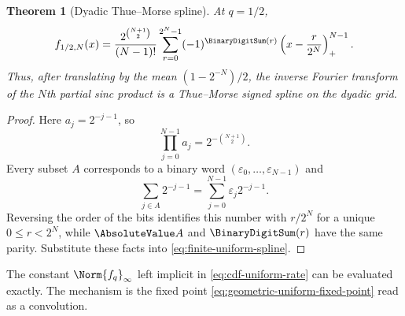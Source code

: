 \documentclass[11pt,a4paper,oneside,openany]{book}
\newtheorem{theorem}{Theorem}[chapter]
\theoremstyle{definition}
\theoremstyle{remark}
\begin{document}
\begin{theorem}[Dyadic Thue--Morse spline]\label{thm:dyadic-thue-morse-spline}
At $q=1/2$,
\begin{equation}\label{eq:dyadic-thue-morse-spline}
 f_{1/2,N}(x)
 =\frac{2^{\binom{N+1}{2}}}{(N-1)!}
 \sum_{r=0}^{2^N-1}(-1)^{\BinaryDigitSum(r)}
 \left(x-\frac r{2^N}\right)_+^{N-1}.
\end{equation}
Thus, after translating by the mean $(1-2^{-N})/2$, the inverse Fourier transform of the $N$th partial sinc product is a Thue--Morse signed spline on the dyadic grid.
\end{theorem}

\begin{proof}
Here $a_j=2^{-j-1}$, so
\[
 \prod_{j=0}^{N-1}a_j=2^{-\binom{N+1}{2}}.
\]
Every subset $A$ corresponds to a binary word $(\varepsilon_0,\ldots,\varepsilon_{N-1})$ and
\[
 \sum_{j\in A}2^{-j-1}
 =\sum_{j=0}^{N-1}\varepsilon_j2^{-j-1}.
\]
Reversing the order of the bits identifies this number with $r/2^N$ for a unique
$0\le r<2^N$, while $\AbsoluteValue A$ and $\BinaryDigitSum(r)$ have the same parity.  Substitute these facts into \eqref{eq:finite-uniform-spline}.
\end{proof}


The constant $\Norm{f_q}_\infty$ left implicit in \eqref{eq:cdf-uniform-rate} can be
evaluated exactly.  The mechanism is the fixed point
\eqref{eq:geometric-uniform-fixed-point} read as a convolution.
\end{document}
